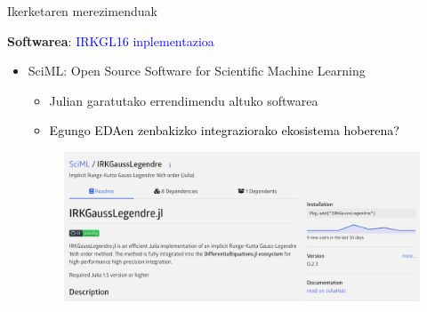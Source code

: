 \documentclass[
 10pt,%
 compress,%
 t,       %
 xcolor=svgnames
]{beamer}
\theoremstyle{definition} \newtheorem{definicion}{Definicion}[section]
\theoremstyle{propiedades} \newtheorem{propiedades}{Propiedades}[section]
\begin{document}

\begin{frame}{Ikerketaren merezimenduak} 
	
	
	\medskip
	\medskip
	\textbf{Softwarea}: \textcolor{blue}{IRKGL16 inplementazioa}
	\small
	
	\medskip
	\begin{itemize}
		\item  SciML: Open Source Software for Scientific Machine Learning
		\begin{itemize}
			\item Julian garatutako errendimendu altuko softwarea
			\item  \textcolor{black}{Egungo EDAen zenbakizko integraziorako ekosistema hoberena? }
		\end{itemize}
		\begin{figure}
			\begin{minipage}{1.\textwidth}
				\colorbox{white}  {\includegraphics[width=0.8\linewidth]{SCIMLIRKGaussLegendre2023}}
			\end{minipage}
		\end{figure}
		
		

		
		
	\end{itemize}
	
\end{frame}
\end{document}
